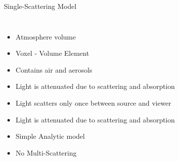\documentclass[compress,red,12pt]{beamer}
\begin{document}
\begin{frame}{Single-Scattering Model}
  \begin{columns}[c]
    \begin{itemize}
    \item <1-2> Atmosphere volume
    \item <2-3> Voxel - Volume Element
    \item <3> Contains air and aerosols
    \item <4> Light is attenuated due to scattering and absorption
    \item <5> Light scatters only once between source and viewer
    \item <6> Light is attenuated due to scattering and absorption
    \item <7> Simple Analytic model
    \item <7> No Multi-Scattering
    \end{itemize}


\end{columns}
\end{frame}
\end{document}
